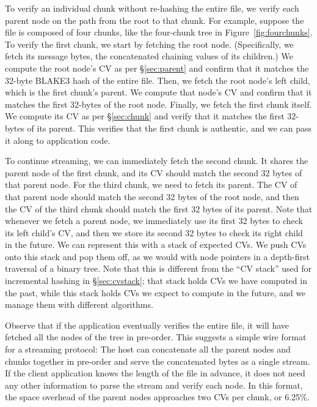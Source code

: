 \documentclass[11pt,notitlepage,a4paper]{article}
\begin{document}
To verify an individual chunk without re-hashing the entire file, we verify
each parent node on the path from the root to that chunk. For example, suppose
the file is composed of four chunks, like the four-chunk tree in
Figure~\ref{fig:fourchunks}. To verify the first chunk, we start by fetching
the root node. (Specifically, we fetch its message bytes, the concatenated
chaining values of its children.) We compute the root node's CV as per
\S\ref{sec:parent} and confirm that it matches the 32-byte BLAKE3 hash of the
entire file. Then, we fetch the root node's left child, which is the first
chunk's parent. We compute that node's CV and confirm that it matches the first
32-bytes of the root node. Finally, we fetch the first chunk itself. We compute
its CV as per \S\ref{sec:chunk} and verify that it matches the first 32-bytes
of its parent. This verifies that the first chunk is authentic, and we can pass
it along to application code.

To continue streaming, we can immediately fetch the second chunk. It shares the
parent node of the first chunk, and its CV should match the second 32 bytes of
that parent node. For the third chunk, we need to fetch its parent. The CV of
that parent node should match the second 32 bytes of the root node, and then
the CV of the third chunk should match the first 32 bytes of its parent. Note
that whenever we fetch a parent node, we immediately use its first 32 bytes to
check its left child's CV, and then we store its second 32 bytes to check its
right child in the future. We can represent this with a stack of expected CVs.
We push CVs onto this stack and pop them off, as we would with node pointers in
a depth-first traversal of a binary tree. Note that this is different from the
``CV stack'' used for incremental hashing in \S\ref{sec:cvstack}; that stack
holds CVs we have computed in the past, while this stack holds CVs we expect to
compute in the future, and we manage them with different algorithms.

Observe that if the application eventually verifies the entire file, it will
have fetched all the nodes of the tree in pre-order. This suggests a simple
wire format for a streaming protocol: The host can concatenate all the parent
nodes and chunks together in pre-order and serve the concatenated bytes as a
single stream. If the client application knows the length of the file in
advance, it does not need any other information to parse the stream and verify
each node. In this format, the space overhead of the parent nodes approaches
two CVs per chunk, or 6.25\%.
\end{document}
